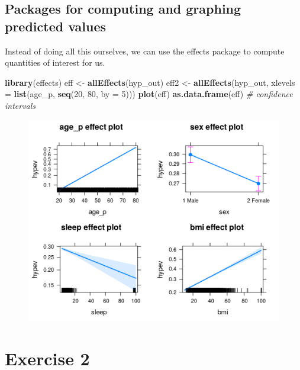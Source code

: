 \documentclass[]{book}
\newenvironment{Shaded}{\begin{snugshade}}{\end{snugshade}}
\newcommand{\KeywordTok}[1]{\textcolor[rgb]{0.13,0.29,0.53}{\textbf{#1}}}
\newcommand{\DataTypeTok}[1]{\textcolor[rgb]{0.13,0.29,0.53}{#1}}
\newcommand{\DecValTok}[1]{\textcolor[rgb]{0.00,0.00,0.81}{#1}}
\newcommand{\StringTok}[1]{\textcolor[rgb]{0.31,0.60,0.02}{#1}}
\newcommand{\CommentTok}[1]{\textcolor[rgb]{0.56,0.35,0.01}{\textit{#1}}}
\newcommand{\NormalTok}[1]{#1}
\begin{document}
\subsection{Packages for computing and graphing predicted
values}\label{packages-for-computing-and-graphing-predicted-values}

Instead of doing all this ourselves, we can use the effects package to
compute quantities of interest for us.

\begin{Shaded}
\begin{Highlighting}[]
  \KeywordTok{library}\NormalTok{(effects)}
\NormalTok{  eff <-}\StringTok{ }\KeywordTok{allEffects}\NormalTok{(hyp_out)}
\NormalTok{  eff2 <-}\StringTok{ }\KeywordTok{allEffects}\NormalTok{(hyp_out, }\DataTypeTok{xlevels =} \KeywordTok{list}\NormalTok{(age_p, }\KeywordTok{seq}\NormalTok{(}\DecValTok{20}\NormalTok{, }\DecValTok{80}\NormalTok{, }\DataTypeTok{by =} \DecValTok{5}\NormalTok{)))}
  \KeywordTok{plot}\NormalTok{(eff)}
  \KeywordTok{as.data.frame}\NormalTok{(eff) }\CommentTok{# confidence intervals}
\end{Highlighting}
\end{Shaded}

\begin{figure}
\centering
\includegraphics{R/Rmodels/images/effects1.png}
\caption{}
\end{figure}

\section{Exercise 2}\label{exercise-2}
\end{document}
